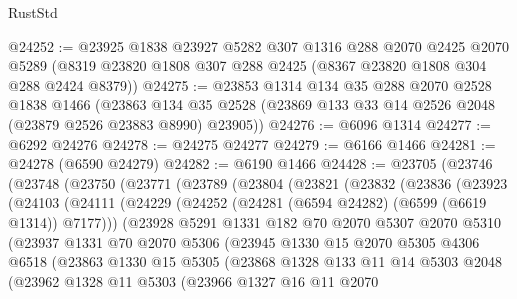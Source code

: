 \begin{lexlean}{RustStd}
\begin{coremodule}
@24252 := @23925
    @1838
    @23927
    @5282
    @307
    @1316
    @288
    @2070
    @2425
    @2070
    @5289
    (@8319 @23820 @1808 @307 @288 @2425 (@8367 @23820 @1808 @304 @288 @2424 @8379))
@24275 := @23853
    @1314
    @134
    @35
    @288
    @2070
    @2528
    @1838
    @1466
    (@23863 @134 @35 @2528 (@23869 @133 @33 @14 @2526 @2048 (@23879 @2526 @23883 @8990) @23905))
@24276 := @6096 @1314
@24277 := @6292 @24276
@24278 := @24275 @24277
@24279 := @6166 @1466
@24281 := @24278 (@6590 @24279)
@24282 := @6190 @1466
@24428 := @23705
    (@23746
      (@23748
        (@23750
          (@23771
            (@23789
              (@23804
                (@23821
                  (@23832
                    (@23836
                      (@23923
                        (@24103
                          (@24111
                            (@24229 (@24252 (@24281 (@6594 @24282) (@6599 (@6619 @1314)) @7177)))
                            (@23928
                              @5291
                              @1331
                              @182
                              @70
                              @2070
                              @5307
                              @2070
                              @5310
                              (@23937
                                @1331
                                @70
                                @2070
                                @5306
                                (@23945
                                  @1330
                                  @15
                                  @2070
                                  @5305
                                  @4306
                                  @6518
                                  (@23863
                                    @1330
                                    @15
                                    @5305
                                    (@23868
                                      @1328
                                      @133
                                      @11
                                      @14
                                      @5303
                                      @2048
                                      (@23962
                                        @1328
                                        @11
                                        @5303
                                        (@23966
                                          @1327
                                          @16
                                          @11
                                          @2070

\end{coremodule}
\end{lexlean}
